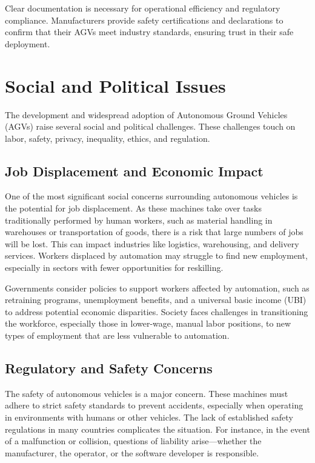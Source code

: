 \documentclass[../../main]{subfiles}
\begin{document}
Clear documentation is necessary for operational efficiency and 
regulatory compliance. Manufacturers provide safety certifications 
and declarations to confirm that their AGVs meet industry standards, 
ensuring trust in their safe deployment.
\section{Social and Political Issues}

The development and widespread adoption of Autonomous Ground Vehicles (AGVs) 
raise several social and political challenges. These challenges touch on labor, 
safety, privacy, inequality, ethics, and regulation.

\subsection{Job Displacement and Economic Impact}
One of the most significant social concerns surrounding autonomous vehicles is the potential for job 
displacement. As these machines take over tasks traditionally performed by human workers, such as material 
handling in warehouses or transportation of goods, there is a risk that large numbers of jobs will 
be lost. This can impact industries like logistics, warehousing, and delivery services. Workers 
displaced by automation may struggle to find new employment, especially in sectors with fewer opportunities 
for reskilling.

Governments  consider policies to support workers affected by 
automation, such as retraining programs, unemployment benefits, and a universal basic income (UBI) 
to address potential economic disparities. Society faces challenges in transitioning the workforce, especially 
those in lower-wage, manual labor positions, to new types of employment that are less vulnerable 
to automation.

\subsection{Regulatory and Safety Concerns}

The safety of autonomous vehicles is a major concern. These machines must adhere to strict safety standards 
to prevent accidents, especially when operating in environments with humans or other vehicles. 
The lack of established safety regulations in many countries complicates the situation. For instance, 
in the event of a malfunction or collision, questions of liability arise—whether the manufacturer, 
the operator, or the software developer is responsible.
\end{document}
